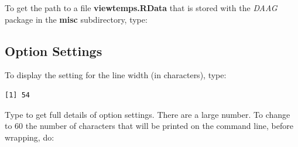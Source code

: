 To get the path to a file {\bf viewtemps.RData} that is stored with
the {\em DAAG} package in the {\bf misc} subdirectory, type:
\begin{fullwidth}

\begin{knitrout}
\color{fgcolor}\begin{kframe}
\begin{alltt}
\hlstd{(}\hlstd{,} \hlstd{=}\hlstd{)}
\end{alltt}
\end{kframe}
\end{knitrout}

\end{fullwidth}
\vspace*{-7pt}

\subsection{Option Settings}

\begin{marginfigure}[44pt]
To display the setting for the
line width (in characters), type:
\begin{knitrout}
\color{fgcolor}\begin{kframe}
\begin{alltt}
\hlstd{()}\hlopt{$}
\end{alltt}
\begin{verbatim}
[1] 54
\end{verbatim}
\end{kframe}
\end{knitrout}
\end{marginfigure}
Type  to get full details of option settings.
There are a large number.  To change to 60 the number of characters
that will be printed on the command line, before wrapping, do:
\begin{knitrout}
\color{fgcolor}\begin{kframe}
\begin{alltt}
\hlstd{(}\hlstd{=}\hlstd{)}
\end{alltt}
\end{kframe}
\end{knitrout}

